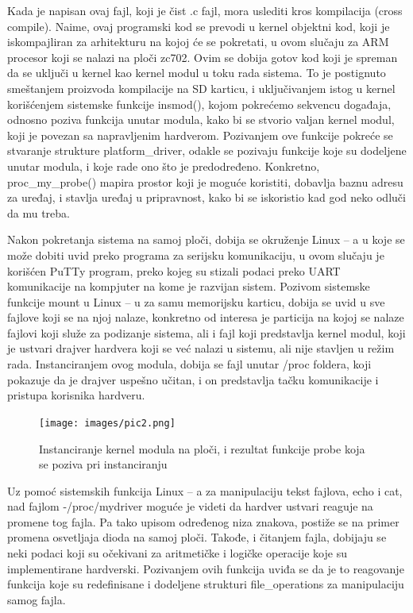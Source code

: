 \documentclass[a4paper, 12pt, diplomski]{etf}
\begin{document}
	Kada je napisan ovaj fajl, koji je čist .c fajl, mora uslediti kros kompilacija (cross compile). Naime, ovaj programski kod se prevodi u kernel objektni kod, koji je iskompajliran za arhitekturu na kojoj će se pokretati, u ovom slučaju za ARM procesor koji se nalazi na ploči zc702. Ovim se dobija gotov kod koji je spreman da se uključi u kernel kao kernel modul u toku rada sistema. To je postignuto smeštanjem proizvoda kompilacije  na SD karticu, i uključivanjem istog u kernel korišćenjem sistemske funkcije insmod(), kojom pokrećemo sekvencu događaja, odnosno poziva funkcija unutar modula, kako bi se stvorio valjan kernel modul, koji je povezan sa napravljenim hardverom. Pozivanjem ove funkcije pokreće se stvaranje strukture platform\_driver, odakle se pozivaju funkcije koje su dodeljene unutar modula, i koje rade ono što je predodređeno. Konkretno, proc\_my\_probe() mapira prostor koji je moguće koristiti, dobavlja baznu adresu za uređaj, i stavlja uređaj u pripravnost, kako bi se iskoristio kad god neko odluči da mu treba.

	Nakon pokretanja sistema na samoj ploči, dobija se okruženje Linux – a u koje se može dobiti uvid preko programa za serijsku komunikaciju, u ovom slučaju je korišćen PuTTy program, preko kojeg su stizali podaci preko UART komunikacije na kompjuter na kome je razvijan sistem. Pozivom sistemske funkcije mount u Linux – u za samu memorijsku karticu, dobija se uvid u sve fajlove koji se na njoj nalaze, konkretno od interesa je particija na kojoj se nalaze fajlovi koji služe za podizanje sistema, ali i fajl koji predstavlja kernel modul, koji je ustvari drajver hardvera koji se već nalazi u sistemu, ali nije stavljen u režim rada. Instanciranjem ovog modula, dobija se fajl unutar /proc foldera, koji pokazuje da je drajver uspešno učitan, i on predstavlja tačku komunikacije i pristupa korisnika hardveru.

	\begin{figure}[h!]
		\centering
		\texttt{[image: images/pic2.png]}
		\caption{Instanciranje kernel modula na ploči, i rezultat funkcije probe koja se poziva pri instanciranju}
		\label{fig:insmod}
	\end{figure}

	Uz pomoć sistemskih funkcija Linux – a za manipulaciju tekst fajlova, echo i cat, nad fajlom -/proc/mydriver moguće je videti da hardver ustvari reaguje na promene tog fajla. Pa tako upisom određenog niza znakova, postiže se na primer promena osvetljaja dioda na samoj ploči. Takođe, i čitanjem fajla, dobijaju se neki podaci koji su očekivani za aritmetičke i logičke operacije koje su implementirane hardverski. Pozivanjem ovih funkcija uviđa se da je to reagovanje funkcija koje su redefinisane i dodeljene strukturi file\_operations za manipulaciju samog fajla.
\end{document}
